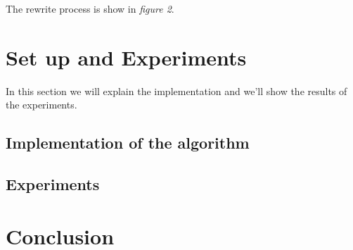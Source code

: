 \documentclass[10pt]{article}
\begin{document}
	The rewrite process is show in \textit{figure 2}.

	
	\section{Set up and Experiments}
	In this section we will explain the implementation and we'll show the results of the experiments.
	\subsection{Implementation of the algorithm}
	\subsection{Experiments}
	\section{Conclusion}
\end{document}

